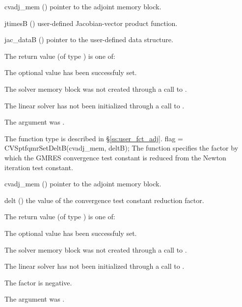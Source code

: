 {
  \begin{args}
  \item[cvadj\_mem] ()
    pointer to the adjoint memory block.
  \item[jtimesB] ()
    user-defined Jacobian-vector product function.
  \item[jac\_dataB] ()
    pointer to the user-defined data structure.
  \end{args}
}
{
  The return value  (of type ) is one of:
  \begin{args}
  \item[\Id{CVSPGMR\_SUCCESS}] 
    The optional value has been successfuly set.
  \item[\Id{CVSPGMR\_MEM\_NULL}]
    The {\cvodes} solver memory block was not created through a call to .
  \item[\Id{CVSPGMR\_LMEM\_NULL}]
    The {\cvsptfqmr} linear solver has not been initialized through a call to .
  \item[\Id{CVSPGMR\_ADJMEM\_NULL}]
    The  argument was .
  \end{args}
}
{
  The function type  is described in \S\ref{ss:user_fct_adj}.
}
{
  flag = CVSptfqmrSetDeltB(cvadj\_mem, deltB);
}
{
  The function  specifies the factor by
  which the GMRES convergence test constant is reduced
  from the Newton iteration test constant.
}
{
  \begin{args}
  \item[cvadj\_mem] ()
    pointer to the adjoint memory block.
  \item[delt] ()
    the value of the convergence test constant reduction factor.
  \end{args}
}
{
  The return value  (of type ) is one of:
  \begin{args}
  \item[\Id{CVSPGMR\_SUCCESS}] 
    The optional value has been successfuly set.
  \item[\Id{CVSPGMR\_MEM\_NULL}]
    The {\cvodes} solver memory block was not created through a call to .
  \item[\Id{CVSPGMR\_LMEM\_NULL}]
    The {\cvsptfqmr} linear solver has not been initialized through a call to .
  \item[\Id{CVSPGMR\_ILL\_INPUT}]
    The factor  is negative.  
  \item[\Id{CVSPGMR\_ADJMEM\_NULL}]
    The  argument was .
  \end{args}
}

